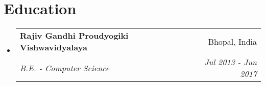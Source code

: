 \documentclass[letterpaper,12pt]{article}
\makeatletter
\newcommand{\resumeItem}[1]{
  \item\small{#1}\vspace{-2pt}
}
\newcommand{\resumeSubheading}[4]{
  \vspace{-2pt}\item
    \begin{tabular*}{0.97\textwidth}[t]{l@{\extracolsep{\fill}}r}
      \textbf{#1} & \small{#2} \\
      \textit{\small{#3}} & \textit{\small{#4}} \\
    \end{tabular*}\vspace{-5pt}
}
\newcommand{\resumeItemHeader}[1]{
    \item{\small{#1}}\vspace{-5pt}
}
\newcommand{\resumeItemFooter}[1]{
    \\ \vspace{7pt}\hspace{-0.35in}\footnotesize\emph{#1}
}
\newcommand{\resumeSubHeadingListStart}{\begin{itemize}[leftmargin=0.15in, label={}]}
\newcommand{\resumeSubHeadingListEnd}{\end{itemize}}
\newcommand{\resumeItemListStart}{\begin{itemize}}
\newcommand{\resumeItemListEnd}{\end{itemize}\vspace{-5pt}}
\def\myHometown{Bhopal, India}
\makeatother
\begin{document}





\section{Education}
\vspace{3pt}
\resumeSubHeadingListStart

\resumeSubheading
{Rajiv Gandhi Proudyogiki Vishwavidyalaya}{\myHometown}
{B.E. - Computer Science}{Jul 2013 - Jun 2017}

\resumeSubHeadingListEnd




\end{document}
